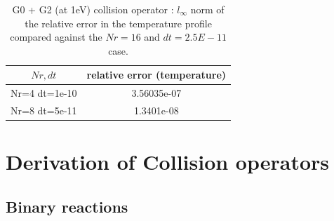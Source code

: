 \documentclass{article}
\begin{document}
\begin{table}[H]
    \centering
    \begin{tabular}{|c|c|}
        \hline
        $Nr,dt$ & relative error (temperature)\\
        \hline
        Nr=4 dt=1e-10         &       3.56035e-07 \\
        Nr=8 dt=5e-11         &       1.3401e-08   \\
        \hline
    \end{tabular}
    \caption{G0 + G2 (at 1eV) collision operator : $l_\infty$ norm of the relative error in the temperature profile compared against the $Nr=16$ and $dt=2.5E-11$ case. }
\end{table}






\appendix

\section{Derivation of Collision operators}

\subsection{Binary reactions}
\end{document}
